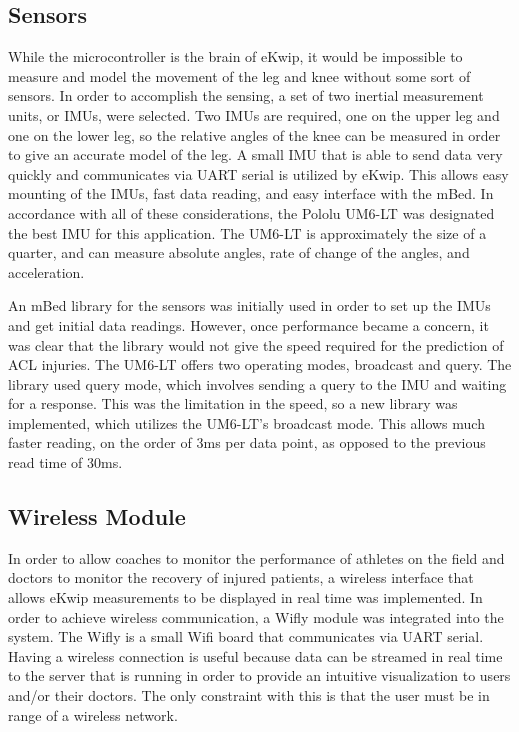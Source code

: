 \subsection {Sensors}
While the microcontroller is the brain of eKwip, it would be impossible to measure and model the movement of the leg and knee without some sort of sensors. In order to accomplish the sensing, a set of two inertial measurement units, or IMUs, were selected. Two IMUs are required, one on the upper leg and one on the lower leg, so the relative angles of the knee can be measured in order to give an accurate model of the leg. A small IMU that is able to send data very quickly and communicates via UART serial is utilized by eKwip. This allows easy mounting of the IMUs, fast data reading, and easy interface with the mBed. In accordance with all of these considerations, the Pololu UM6-LT was designated the best IMU for this application. The UM6-LT is approximately the size of a quarter, and can measure absolute angles, rate of change of the angles, and acceleration.

An mBed library for the sensors was initially used in order to set up the IMUs and get initial data readings. However, once performance became a concern, it was clear that the library would not give the speed required for the prediction of ACL injuries. The UM6-LT offers two operating modes, broadcast and query. The library used query mode, which involves sending a query to the IMU and waiting for a response. This was the limitation in the speed, so a new library was implemented, which utilizes the UM6-LT's broadcast mode. This allows much faster reading, on the order of 3ms per data point, as opposed to the previous read time of 30ms.

\subsection {Wireless Module}
In order to allow coaches to monitor the performance of athletes on the field and doctors to monitor the recovery of injured patients, a wireless interface that allows eKwip measurements to be displayed in real time was implemented. In order to achieve wireless communication, a Wifly module was integrated into the system. The Wifly is a small Wifi board that communicates via UART serial. Having a wireless connection is useful because data can be streamed in real time to the server that is running in order to provide an intuitive visualization to users and/or their doctors. The only constraint with this is that the user must be in range of a wireless network.

